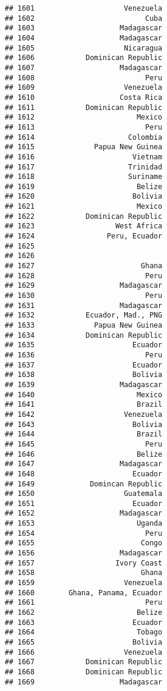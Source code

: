 \documentclass[
]{article}
\begin{document}
\begin{verbatim}
## 1601                     Venezuela
## 1602                          Cuba
## 1603                    Madagascar
## 1604                    Madagascar
## 1605                     Nicaragua
## 1606            Dominican Republic
## 1607                    Madagascar
## 1608                          Peru
## 1609                     Venezuela
## 1610                    Costa Rica
## 1611            Dominican Republic
## 1612                        Mexico
## 1613                          Peru
## 1614                      Colombia
## 1615              Papua New Guinea
## 1616                       Vietnam
## 1617                      Trinidad
## 1618                      Suriname
## 1619                        Belize
## 1620                       Bolivia
## 1621                        Mexico
## 1622            Dominican Republic
## 1623                   West Africa
## 1624                 Peru, Ecuador
## 1625                              
## 1626                              
## 1627                         Ghana
## 1628                          Peru
## 1629                    Madagascar
## 1630                          Peru
## 1631                    Madagascar
## 1632            Ecuador, Mad., PNG
## 1633              Papua New Guinea
## 1634            Dominican Republic
## 1635                       Ecuador
## 1636                          Peru
## 1637                       Ecuador
## 1638                       Bolivia
## 1639                    Madagascar
## 1640                        Mexico
## 1641                        Brazil
## 1642                     Venezuela
## 1643                       Bolivia
## 1644                        Brazil
## 1645                          Peru
## 1646                        Belize
## 1647                    Madagascar
## 1648                       Ecuador
## 1649             Domincan Republic
## 1650                     Guatemala
## 1651                       Ecuador
## 1652                    Madagascar
## 1653                        Uganda
## 1654                          Peru
## 1655                         Congo
## 1656                    Madagascar
## 1657                   Ivory Coast
## 1658                         Ghana
## 1659                     Venezuela
## 1660        Ghana, Panama, Ecuador
## 1661                          Peru
## 1662                        Belize
## 1663                       Ecuador
## 1664                        Tobago
## 1665                       Bolivia
## 1666                     Venezuela
## 1667            Dominican Republic
## 1668            Dominican Republic
## 1669                    Madagascar

\end{verbatim}
\end{document}
